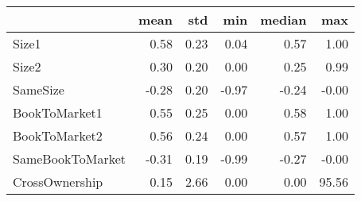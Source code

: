 \begin{tabular}{lrrrrr}
\toprule
{} &  mean &   std &   min &  median &    max \\
\midrule
Size1            &  0.58 &  0.23 &  0.04 &    0.57 &   1.00 \\
Size2            &  0.30 &  0.20 &  0.00 &    0.25 &   0.99 \\
SameSize         & -0.28 &  0.20 & -0.97 &   -0.24 &  -0.00 \\
BookToMarket1    &  0.55 &  0.25 &  0.00 &    0.58 &   1.00 \\
BookToMarket2    &  0.56 &  0.24 &  0.00 &    0.57 &   1.00 \\
SameBookToMarket & -0.31 &  0.19 & -0.99 &   -0.27 &  -0.00 \\
CrossOwnership   &  0.15 &  2.66 &  0.00 &    0.00 &  95.56 \\
\bottomrule
\end{tabular}

